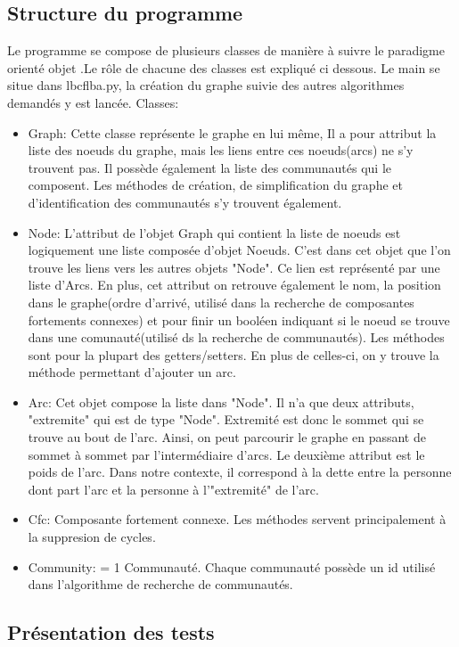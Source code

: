 \documentclass[a4paper]{article}
\begin{document}
\subsection{Structure du programme}
Le programme se compose de plusieurs classes de manière à suivre le paradigme orienté objet .Le rôle de chacune des classes est expliqué ci dessous. Le main se situe dans lbcflba.py, la création du graphe suivie des autres algorithmes demandés y est lancée.  
\smallbreak
\noindent Classes:
\begin{itemize} 
\item Graph: Cette classe représente le graphe en lui même, Il a pour attribut la liste des noeuds du graphe, mais les liens entre ces noeuds(arcs) ne s'y trouvent pas. Il possède également la liste des communautés qui le composent. Les méthodes de création, de simplification du graphe et d'identification des communautés s'y trouvent également.
\item Node: L'attribut de l'objet Graph qui contient la liste de noeuds est logiquement une liste composée d'objet Noeuds. C'est dans cet objet que l'on trouve les liens vers les autres objets "Node". Ce lien est représenté par une liste d'Arcs. En plus, cet attribut on retrouve également le nom, la position dans le graphe(ordre d'arrivé, utilisé dans la recherche de composantes fortements connexes) et pour finir un booléen indiquant si le noeud se trouve dans une comunauté(utilisé ds la recherche de communautés). Les méthodes sont pour la plupart des getters/setters. En plus de celles-ci, on y trouve la méthode permettant d'ajouter un arc. 
\item Arc: Cet objet compose la liste dans "Node". Il n'a que deux attributs, "extremite" qui est de type "Node". Extremité est donc le sommet qui se trouve au bout de l'arc. Ainsi, on peut parcourir le graphe en passant de sommet à sommet par l'intermédiaire d'arcs. Le deuxième attribut est le poids de l'arc. Dans notre contexte, il correspond à la dette entre la personne dont part l'arc et la personne à l'"extremité" de l'arc.
\item Cfc: Composante fortement connexe. Les méthodes servent principalement à la suppresion de cycles.
\item Community: = 1 Communauté. Chaque communauté possède un id utilisé dans l'algorithme de recherche de communautés.   
\end{itemize}
\newpage
\subsection{Présentation des tests}
\end{document}
